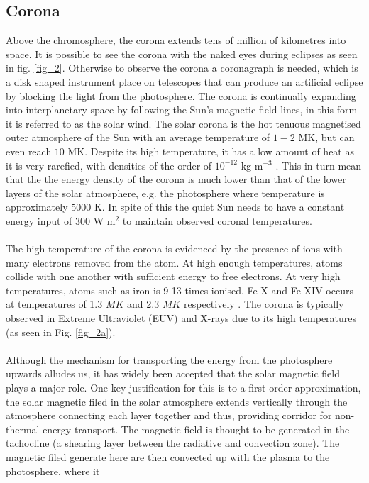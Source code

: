 \documentclass[12pt,a4paper,twoside]{article}
\begin{document}
\subsection{Corona}
Above the chromosphere, the corona extends tens of million of kilometres into space. It is possible to see the corona with the naked eyes during eclipses as seen in fig. \ref{fig_2}. Otherwise to observe the corona a coronagraph is needed, which is a disk shaped instrument place on telescopes that can produce an artificial eclipse by blocking the light from the photosphere. The corona is continually expanding into interplanetary space by following the Sun's magnetic field lines, in this form it is referred to as the solar wind. The solar corona is the hot tenuous magnetised outer atmosphere of the Sun with an average temperature of $1-2$ MK, but can even reach $10$ MK. Despite its high temperature, it has a low amount of heat as it is very rarefied, with densities of the order of $10^{-12}$ kg m$^{-3}$ \citep{priest2014magnetohydrodynamics}. This in turn mean that the the energy density of the corona is much lower than that of the lower layers of the solar atmosphere, e.g. the photosphere where temperature is approximately $5000$ K. In spite of this the quiet Sun needs to have a constant energy input of $300$ W m$^2$ \citep{priest2014magnetohydrodynamics} to maintain observed coronal temperatures. \\ \\ The high temperature of the corona is evidenced by the presence of ions with many electrons removed from the atom. At high enough temperatures, atoms collide with one another with sufficient energy to free electrons. At very high temperatures, atoms such as iron is 9-13 times ionised. Fe X and Fe XIV occurs at temperatures of 1.3 $MK$ and 2.3  $MK$ respectively \citep{narayanan2014introduction}. The corona is typically observed in Extreme Ultraviolet (EUV) and X-rays due to its high temperatures (as seen in Fig. \ref{fig_2a}). \\ \\ Although the mechanism for transporting the energy from the photosphere upwards alludes us, it has widely been accepted that the solar magnetic field plays a major role. One key justification for this is to a first order approximation, the solar magnetic filed in the solar atmosphere extends vertically through the atmosphere connecting each layer together and thus, providing corridor for non-thermal energy transport. The magnetic field is thought to be generated in the tachocline (a shearing layer between the radiative and convection zone). The magnetic filed generate here are then convected up with the plasma to the photosphere, where it 
\end{document}
